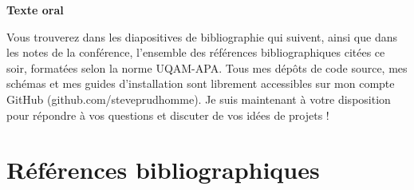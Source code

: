 \documentclass[10pt,letterpaper]{article}
\newcommand{\repere}[1]{\textcolor{accent}{\bfseries #1}\par}
\begin{document}
\par\medskip\repere{Texte oral}

Vous trouverez dans les diapositives de bibliographie qui suivent, ainsi que dans les notes de la conférence, l'ensemble des références bibliographiques citées ce soir, formatées selon la norme UQAM-APA. Tous mes dépôts de code source, mes schémas et mes guides d'installation sont librement accessibles sur mon compte GitHub (github.com/steveprudhomme). Je suis maintenant à votre disposition pour répondre à vos questions et discuter de vos idées de projets !\par

\clearpage\section*{Références bibliographiques}

\nocite{*}
\end{document}
